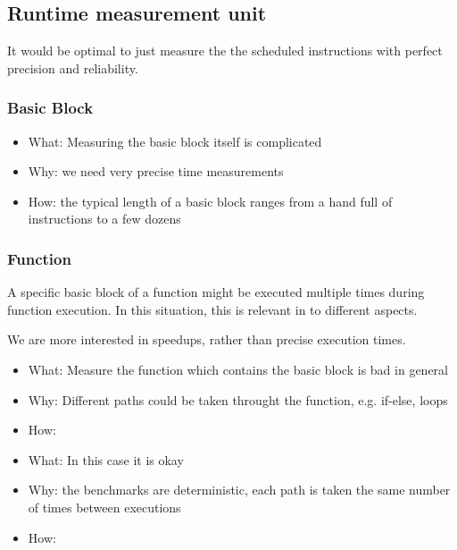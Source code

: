 \subsection{Runtime measurement unit}
It would be optimal to just measure the the scheduled instructions with perfect precision and reliability.
\subsubsection{Basic Block}
\begin{itemize}
    \item What: Measuring the basic block itself is complicated
    \item Why: we need very precise time measurements
    \item How: the typical length of a basic block ranges from a hand full of instructions to a few dozens
\end{itemize}
\subsubsection{Function}
A specific basic block of a function might be executed multiple times during function execution.
In this situation, this is relevant in to different aspects.

We are more interested in speedups, rather than precise execution times.


\begin{itemize}
    \item What: Measure the function which contains the basic block is bad in general
    \item Why: Different paths could be taken throught the function, e.g. if-else, loops
    \item How: 
\end{itemize}
\begin{itemize}
    \item What: In this case it is okay
    \item Why: the benchmarks are deterministic, each path is taken the same number of times between executions
    \item How: 
\end{itemize}
